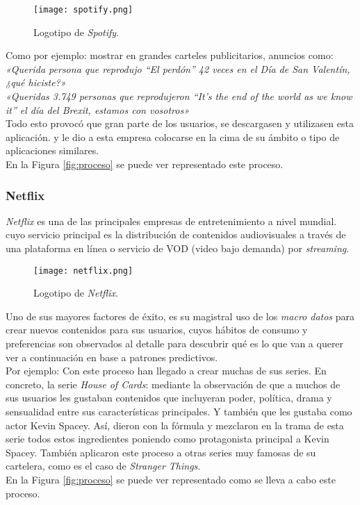 \documentclass[11pt]{diazessay} %
\begin{document}
\begin{figure}[h!]
	\centering
	\texttt{[image: spotify.png]}
	\caption{Logotipo de \textit{Spotify}.}
	\label{fig:spotify}
\end{figure}

\clearpage
Como por ejemplo: mostrar en grandes carteles publicitarios, anuncios como:\\
\textit{«Querida persona que reprodujo “El perdón” 42 veces en el Día de San Valentín, ¿qué hiciste?»}\\
\textit{«Queridas 3.749 personas que reprodujeron “It’s the end of the world as we know it” el día del Brexit, estamos con vosotros»}\\

Todo esto provocó que gran parte de los usuarios, se descargasen y utilizasen esta aplicación. y le dio a esta empresa colocarse en la cima de su ámbito o tipo de aplicaciones similares.\\
En la Figura \ref{fig:proceso} se puede ver representado este proceso.\\


\subsubsection*{Netflix}
\textit{Netflix} \cite{wiki-netflix} es una de las principales empresas de entretenimiento a nivel mundial. cuyo servicio principal es la distribución de contenidos audiovisuales a través de una plataforma en línea o servicio de VOD (video bajo demanda) por \textit{streaming}.

\begin{figure}[h!]
	\centering
	\texttt{[image: netflix.png]}
	\caption{Logotipo de \textit{Netflix}.}
	\label{fig:netflix}
\end{figure}

Uno de sus mayores factores de éxito, es su magistral uso de los \textit{macro datos} para crear nuevos contenidos para sus usuarios, cuyos hábitos de consumo y preferencias son observados al detalle para descubrir qué es lo que van a querer ver a continuación en base a patrones predictivos.\\

Por ejemplo: Con este proceso han llegado a crear muchas de sus series. En concreto, la serie \textit{House of Cards}: mediante la observación de que a muchos de sus usuarios les gustaban contenidos que incluyeran poder, política, drama y sensualidad entre sus características principales. Y también que les gustaba como actor Kevin Spacey. Así, dieron con la fórmula y mezclaron en la trama de esta serie todos estos ingredientes poniendo como protagonista principal a Kevin Spacey. También aplicaron este proceso a otras series muy famosas de su cartelera, como es el caso de \textit{Stranger Things}.\\
En la Figura \ref{fig:proceso} se puede ver representado como se lleva a cabo este proceso.\\
\clearpage
\end{document}
